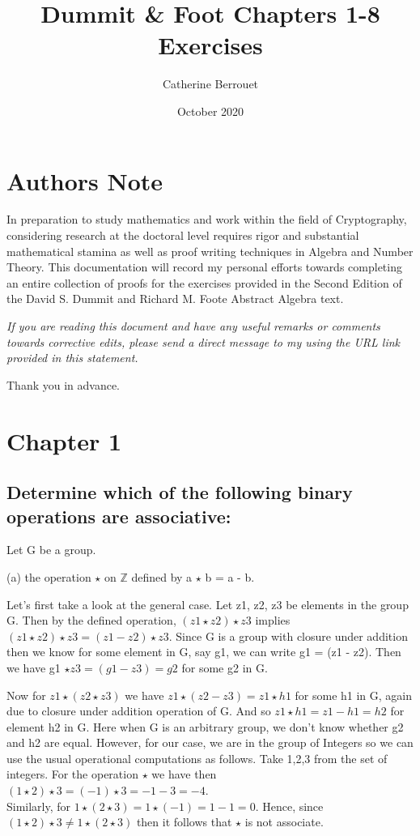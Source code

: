 \documentclass{article}
\title{Dummit \& Foot Chapters 1-8 Exercises}
\author{Catherine Berrouet}
\date{October 2020}
\newcommand{\MYhref}[3][blue]{\href{#2}{\color{#1}{#3}}}%
\begin{document}
\maketitle

\section*{Authors Note}

In preparation to study mathematics and work within the field of Cryptography, considering research at the doctoral level requires rigor and substantial mathematical stamina as well as proof writing techniques in Algebra and Number Theory.  This documentation will record my personal efforts towards completing an entire collection of proofs for the exercises provided in the Second Edition of the David S. Dummit and Richard M. Foote Abstract Algebra text. 

\noindent \textit{If you are reading this document and have any useful remarks or comments towards corrective edits, please send a direct message to my  \MYhref[purple]{https://www.linkedin.com/in/catherineberrouet2/}{professional LinkedIn account} using the URL link provided in this statement.}  

\noindent Thank you in advance.

\clearpage
\section*{Chapter 1}
\subsection{Determine which of the following binary operations are associative:}
Let G be a group. 

(a) the operation $\star$ on $\mathbb{Z}$ defined by a $\star$ b = a - b.

\noindent Let's first take a look at the general case.  Let z1, z2, z3 be elements in the group G.   Then by the defined operation, $ (z1 \star z2) \star z3$ implies  $ (z1 \star z2) \star z3 = (z1 - z2) \star z3 $.  Since G is a group with closure under addition then we know for some element in G, say g1, we can write g1 = (z1 - z2). Then we have g1 $\star z3 = (g1-z3) = g2$ for some g2 in G.

Now for $ z1 \star (z2 \star z3) $ we have $ z1 \star (z2 - z3) = z1 \star h1$ for some h1 in G, again due to closure under addition operation of G. And so $ z1 \star h1 = z1 - h1 = h2$ for element h2 in G.  Here when G is an arbitrary group, we don't know whether g2 and h2 are equal. However, for our case, we are in the group of Integers so we can use the usual operational computations as follows.  Take 1,2,3 from the set of integers. For the operation $\star$ we have then $ (1\star 2)\star 3 = (-1)\star 3 =-1 - 3 = -4$.\\
Similarly, for $ 1\star(2\star 3) = 1\star (-1) = 1-1 = 0$. Hence, since $ (1\star 2)\star 3 \ne 1\star(2\star 3) $ then it follows that $\star$ is not associate.
\end{document}
